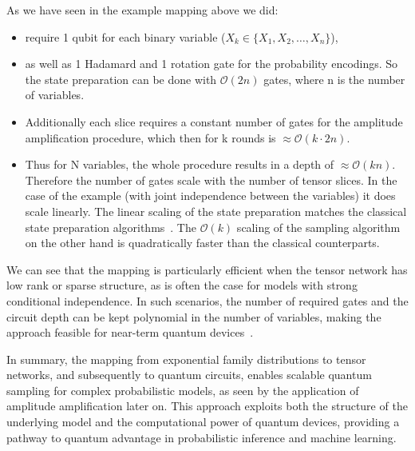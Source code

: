 \documentclass[encoding=utf8,british]{tumphthesis}
\begin{document}
            \begin{tcolorbox}[breakable, width=\linewidth, sharp corners=all, colback=white!95!black]
                As we have seen in the example mapping above we did:
                \begin{itemize}
                    \item require 1 qubit for each binary variable ($X_k \in \{X_1, X_2, \dots, X_n\}$),
                    \item as well as 1 Hadamard and 1 rotation gate for the probability encodings. So the state preparation can be done with $\mathcal{O}(2n)$ gates, where n is the number of variables.
                    \item Additionally each slice requires a constant number of gates for the amplitude amplification procedure, which then for k rounds is $\approx \mathcal{O}(k \cdot 2n)$.
                    \item Thus for N variables, the whole procedure results in a depth of $\approx \mathcal{O}(kn)$.
                    Therefore the number of gates scale with the number of tensor slices. In the case of the example (with joint independence between the variables)
                    it does scale linearly. The linear scaling of the state preparation matches the classical state preparation algorithms~\cite{APXML2025}. The $\mathcal{O}(k)$ scaling
                    of the sampling algorithm on the other hand is quadratically faster than the classical counterparts.
                \end{itemize}
            \end{tcolorbox}
            We can see that the mapping is particularly efficient when the tensor network has low rank or sparse structure, as is often the case for 
            models with strong conditional independence. In such scenarios, the number of required gates and the circuit depth can be kept 
            polynomial in the number of variables, making the approach feasible for near-term quantum devices~\cite{Ran_2020}.

            In summary, the mapping from exponential family distributions to tensor networks, and subsequently to quantum circuits, enables scalable quantum sampling for complex probabilistic models, 
            as seen by the application of amplitude amplification later on. This approach exploits both the structure of the underlying model and the computational power of quantum devices, providing 
            a pathway to quantum advantage in probabilistic inference and machine learning.
\end{document}
